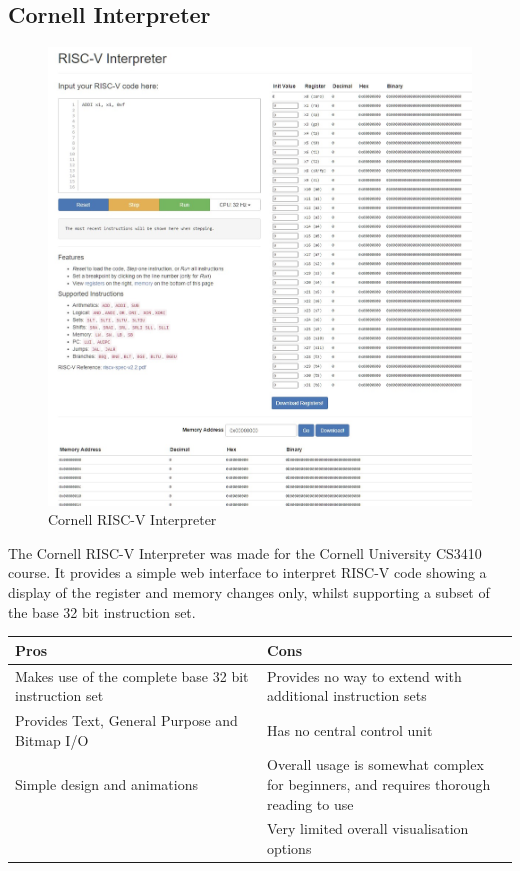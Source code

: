 \subsection{Cornell Interpreter}
\begin{figure}[H]
    \centering
    \includegraphics[width=0.75\linewidth]{dissertation/DATA/CORNELL.jpg}
    \caption{Cornell RISC-V Interpreter}
    \label{fig:cornell}
\end{figure}

The Cornell RISC-V Interpreter \cite{cornelluniversity_riscv} was made for the Cornell University CS3410 course. It provides a simple web interface to interpret RISC-V code showing a display of the register and memory changes only, whilst supporting a subset of the base 32 bit instruction set.

\begin{table}[h]
\begin{tabular}{|p{0.5\linewidth} | p{0.5\linewidth}|}
\hline
\textbf{Pros}                                         & \textbf{Cons}                                                                         \\ \hline
Makes use of the complete base 32 bit instruction set & Provides no way to extend with additional instruction sets                            \\ \hline
Provides Text, General Purpose and Bitmap I/O         & Has no central control unit                                                           \\ \hline
Simple design and animations                          & Overall usage is somewhat complex for beginners, and requires thorough reading to use \\ \hline
                                                      &  Very limited overall visualisation options                                                                                      \\ \hline
\end{tabular}
\end{table}

